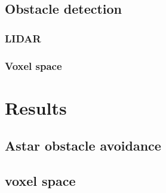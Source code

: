 \documentclass[a4paper, 12pt, titlepage]{article}
\begin{document}
    \subsection{Obstacle detection}
        \subsubsection{LIDAR}
        \subsubsection{Voxel space}

\section{Results}
    \subsection{Astar obstacle avoidance}
    \subsection{voxel space}
        
        
\end{document}
